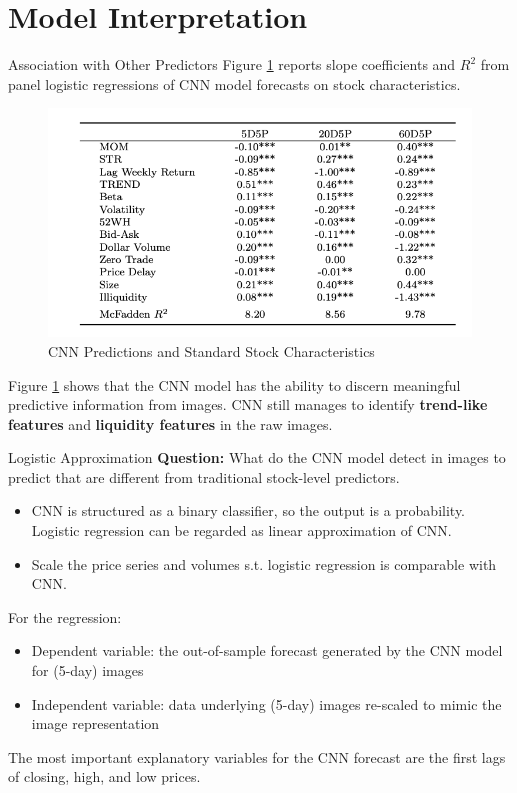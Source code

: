 \documentclass{beamer}
\begin{document}
\section{Model Interpretation}
\begin{frame}{Association with Other Predictors}
Figure \ref{fig:5} reports slope coefficients and $R^2$ from panel logistic regressions of CNN model forecasts on stock characteristics.
    \begin{figure}[h]
        \centering
        \includegraphics[width=.6\textwidth]{images/5 CNN Predictions and Standard Stock Characteristics.png}
        \caption{CNN Predictions and Standard Stock Characteristics}
        \label{fig:5}
    \end{figure}
Figure \ref{fig:5} shows that the CNN model has the ability to discern meaningful predictive information from images. CNN still manages to identify \textbf{trend-like features} and \textbf{liquidity features} in the raw images.
\end{frame}

\begin{frame}{Logistic Approximation}
\textbf{Question: }What do the CNN model detect in images to predict that are different from traditional stock-level predictors. 
    \begin{itemize}
        \item CNN is structured as a binary classifier, so the output is a probability. Logistic regression can be regarded as linear approximation of CNN.
        \item Scale the price series and volumes s.t. logistic regression is comparable with CNN.
    \end{itemize}
    For the regression:
    \begin{itemize}
        \item Dependent variable: the out-of-sample forecast generated by the CNN model for (5-day) images
        \item Independent variable: data underlying (5-day) images re-scaled to mimic the image representation
    \end{itemize}
The most important explanatory variables for the CNN forecast are the first lags of closing, high, and low prices.
\end{frame}
\end{document}
